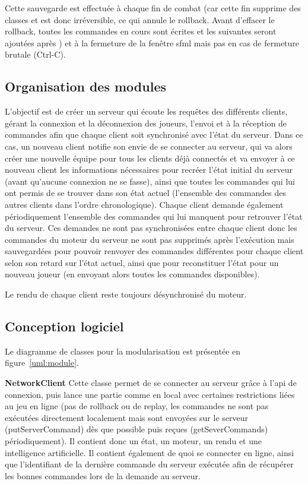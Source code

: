 \documentclass[a4paper,12pt]{article}
\begin{document}
Cette sauvegarde est effectuée à chaque fin de combat (car cette fin supprime des classes et est donc irréversible, ce qui annule le rollback. Avant d'effacer le rollback, toutes les commandes en cours sont écrites et les suivantes seront ajoutées après ) et à la fermeture de la fenêtre sfml mais pas en cas de fermeture brutale (Ctrl-C).

\subsection{Organisation des modules}

L'objectif est de créer un serveur qui écoute les requêtes des différents clients, gérant la connexion et la déconnexion des joueurs, l'envoi et à la réception de commandes afin que chaque client soit synchronisé avec l'état du serveur. Dans ce cas, un nouveau client notifie son envie de se connecter au serveur, qui va alors créer une nouvelle équipe pour tous les clients déjà connectés et va envoyer à ce nouveau client les informations nécessaires pour recréer l'état initial du serveur (avant qu'aucune connexion ne se fasse), ainsi que toutes les commandes qui lui ont permis de se trouver dans son état actuel (l'ensemble des commandes des autres clients dans l'ordre chronologique). Chaque client demande également périodiquement l'ensemble des commandes qui lui manquent pour retrouver l'état du serveur. Ces demandes ne sont pas synchronisées entre chaque client donc les commandes du moteur du serveur ne sont pas supprimés après l'exécution mais sauvegardées pour pouvoir renvoyer des commandes différentes pour chaque client selon son retard sur l'état actuel, ainsi que pour reconstituer l'état pour un nouveau joueur (en envoyant alors toutes les commandes disponibles).

Le rendu de chaque client reste toujours désynchronisé du moteur.

\clearpage
\subsection{Conception logiciel}

Le diagramme de classes pour la modularisation est présentée en figure~\ref{uml:module}.

\textbf{NetworkClient} Cette classe permet de se connecter au serveur grâce à l'api de connexion, puis lance une partie comme en local avec certaines restrictions liées au jeu en ligne (pas de rollback ou de replay, les commandes ne sont pas exécutées directement localement mais sont envoyées sur le serveur (putServerCommand) dès que possible puis reçues (getSeverCommands) périodiquement). Il contient donc un état, un moteur, un rendu et une intelligence artificielle. Il contient également de quoi se connecter en ligne, ainsi que l'identifiant de la dernière commande du serveur exécutée afin de récupérer les bonnes commandes lors de la demande au serveur.
\end{document}

